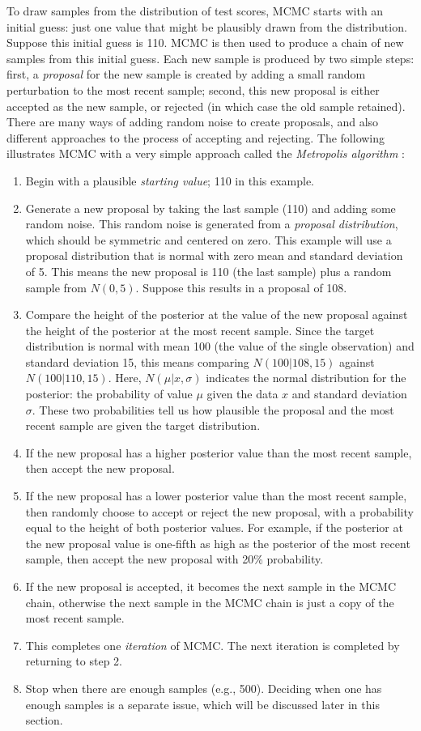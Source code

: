 To draw samples from the distribution of test scores, MCMC starts with an initial guess: just one value that might be plausibly drawn from the distribution. Suppose this initial guess is 110. MCMC is then used to produce a chain of new samples from this initial guess. Each new sample is produced by two simple steps: first, a \emph{proposal} for the new sample is created by adding a small random perturbation to the most recent sample; second, this new proposal is either accepted as the new sample, or rejected (in which case the old sample retained). There are many ways of adding random noise to create proposals, and also different approaches to the process of accepting and rejecting. The following illustrates MCMC with a very simple approach called the \emph{Metropolis algorithm} \cite{SmithRoberts1993}:
\begin{enumerate}
	\item{} Begin with a plausible \emph{starting value}; 110 in this example.
	\item{} Generate a new proposal by taking the last sample (110) and adding some random noise. This random noise is generated from a \emph{proposal distribution}, which should be symmetric and centered on zero. This example will use a proposal distribution that is normal with zero mean and standard deviation of 5. This means the new proposal is 110 (the last sample) plus a random sample from $N(0,5)$. Suppose this results in a proposal of 108.
	\item{} Compare the height of the posterior at the value of the new proposal against the height of the posterior at the most recent sample. Since the target distribution is normal with mean 100 (the value of the single observation) and standard deviation 15, this means comparing $N(100|108,15)$ against $N(100|110,15)$. Here, $N(\mu|x, \sigma)$ indicates the normal distribution for the posterior: the probability of value $\mu$ given the data $x$ and standard deviation $\sigma$. These two probabilities tell us how plausible the proposal and the most recent sample are given the target distribution.
	\item{} If the new proposal has a higher posterior value than the most recent sample, then accept the new proposal.
	\item{} If the new proposal has a lower posterior value than the most recent sample, then randomly choose to accept or reject the new proposal, with a probability equal to the height of both posterior values. For example, if the posterior at the new proposal value is one-fifth as high as the posterior of the most recent sample, then accept the new proposal with 20\% probability.
	\item{} If the new proposal is accepted, it becomes the next sample in the MCMC chain, otherwise the next sample in the MCMC chain is just a copy of the most recent sample. 
	\item{} This completes one \emph{iteration} of MCMC. The next iteration is completed by returning to step 2. 
	\item{} Stop when there are enough samples (e.g., 500). Deciding when one has enough samples is a separate issue, which will be discussed later in this section.
\end{enumerate}

